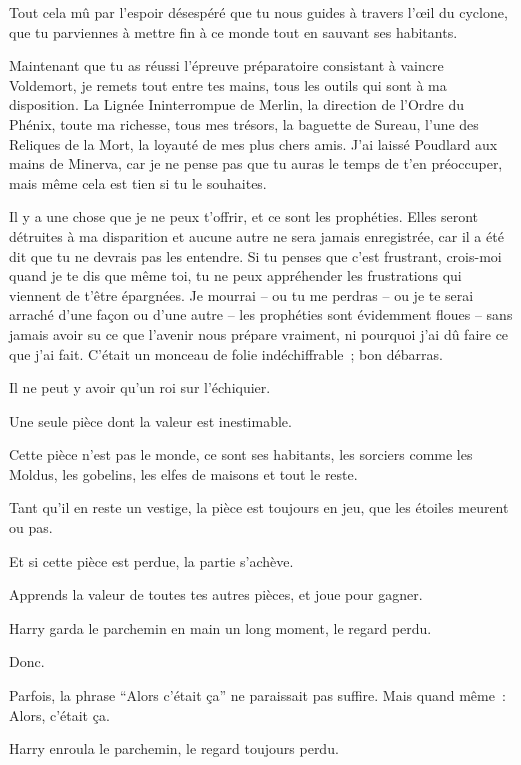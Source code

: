\begin{writtenNote}
Tout cela mû par l'espoir désespéré que tu nous guides à travers l'œil du cyclone, que tu parviennes à mettre fin à ce monde tout en sauvant ses habitants.

Maintenant que tu as réussi l'épreuve préparatoire consistant à vaincre Voldemort, je remets tout entre tes mains, tous les outils qui sont à ma disposition.
La Lignée Ininterrompue de Merlin, la direction de l'Ordre du Phénix, toute ma richesse, tous mes trésors, la baguette de Sureau, l'une des Reliques de la Mort, la loyauté de mes plus chers amis.
J'ai laissé Poudlard aux mains de Minerva, car je ne pense pas que tu auras le temps de t'en préoccuper, mais même cela est tien si tu le souhaites.

Il y a une chose que je ne peux t'offrir, et ce sont les prophéties.
Elles seront détruites à ma disparition et aucune autre ne sera jamais enregistrée, car il a été dit que tu ne devrais pas les entendre.
Si tu penses que c'est frustrant, crois-moi quand je te dis que même toi, tu ne peux appréhender les frustrations qui viennent de t'être épargnées.
Je mourrai -- ou tu me perdras -- ou je te serai arraché d'une façon ou d'une autre -- les prophéties sont évidemment floues -- sans jamais avoir su ce que l'avenir nous prépare vraiment, ni pourquoi j'ai dû faire ce que j'ai fait.
C'était un monceau de folie indéchiffrable~; bon débarras.

Il ne peut y avoir qu'un roi sur l'échiquier.

Une seule pièce dont la valeur est inestimable.

Cette pièce n'est pas le monde, ce sont ses habitants, les sorciers comme les Moldus, les gobelins, les elfes de maisons et tout le reste.

Tant qu'il en reste un vestige, la pièce est toujours en jeu, que les étoiles meurent ou pas.

Et si cette pièce est perdue, la partie s'achève.

Apprends la valeur de toutes tes autres pièces, et joue pour gagner.

\end{writtenNote}

\later

Harry garda le parchemin en main un long moment, le regard perdu.

Donc.

Parfois, la phrase “Alors c'était ça” ne paraissait pas suffire.
Mais quand même~: Alors, c'était ça.

Harry enroula le parchemin, le regard toujours perdu.

